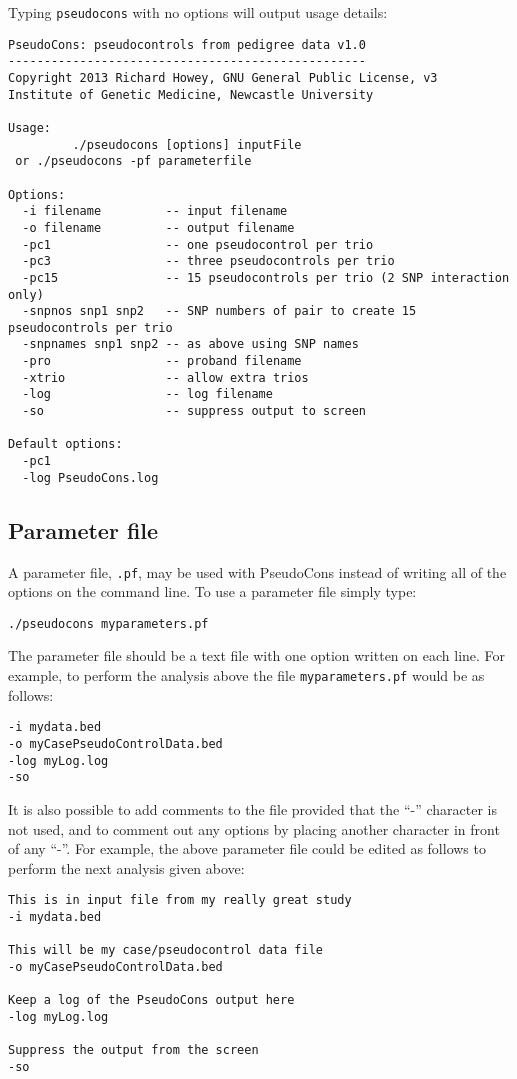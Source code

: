 \documentclass[a4paper,12pt]{article}
\newcommand{\code}[1]{{\footnotesize{{\tt #1}}}}
\begin{document}
Typing \code{pseudocons} with no options will output usage details: 
\begin{verbatim}
PseudoCons: pseudocontrols from pedigree data v1.0
--------------------------------------------------
Copyright 2013 Richard Howey, GNU General Public License, v3
Institute of Genetic Medicine, Newcastle University

Usage:
         ./pseudocons [options] inputFile
 or ./pseudocons -pf parameterfile

Options:
  -i filename         -- input filename
  -o filename         -- output filename
  -pc1                -- one pseudocontrol per trio
  -pc3                -- three pseudocontrols per trio
  -pc15               -- 15 pseudocontrols per trio (2 SNP interaction only)
  -snpnos snp1 snp2   -- SNP numbers of pair to create 15 pseudocontrols per trio
  -snpnames snp1 snp2 -- as above using SNP names
  -pro                -- proband filename
  -xtrio              -- allow extra trios
  -log                -- log filename
  -so                 -- suppress output to screen

Default options:
  -pc1
  -log PseudoCons.log
\end{verbatim}


\subsection{Parameter file}
\label{parameterfile}

A parameter file, \code{.pf}, may be used with PseudoCons instead of writing all of the options on the command line. To use a parameter file simply type: 
\begin{verbatim}
./pseudocons myparameters.pf
\end{verbatim}

The parameter file should be a text file with one option written on each line. For example, to perform the analysis above the file \code{myparameters.pf} would be as follows: 
\begin{verbatim}
-i mydata.bed
-o myCasePseudoControlData.bed
-log myLog.log
-so
\end{verbatim}

It is also possible to add comments to the file provided that the ``-'' character is not used, and to comment out any options by placing another character in front of any ``-''. For example, the above parameter file could be edited as follows to perform the next analysis given above: 
\begin{verbatim}
This is in input file from my really great study
-i mydata.bed

This will be my case/pseudocontrol data file
-o myCasePseudoControlData.bed

Keep a log of the PseudoCons output here
-log myLog.log

Suppress the output from the screen
-so
\end{verbatim}
\end{document}
